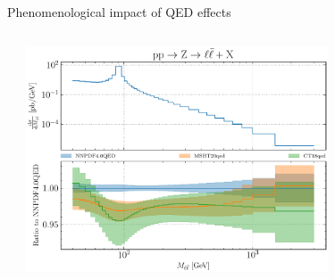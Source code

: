 \documentclass[aspectratio=169, 8pt,t]{beamer}
\begin{document}
\begin{frame}{Phenomenological impact of QED effects}
\begin{columns}[T]
\begin{column}{0.49\textwidth}
\begin{itemize}
      \end{itemize}
    \end{column}
    \begin{column}{0.49\textwidth}
      \vspace*{-3em}
      \includegraphics[width=0.7\textwidth]{figures/NNPDF_DY_14TEV_40_PHENO-global.pdf}
    \end{column}
  \end{columns}
\end{frame}
\end{document}

